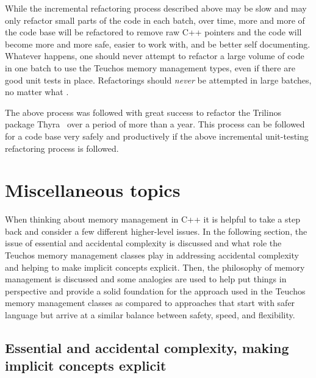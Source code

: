 \documentclass[pdf,ps2pdf,11pt]{SANDreport}
\begin{document}
While the incremental refactoring process described above may be slow
and may only refactor small parts of the code in each batch, over
time, more and more of the code base will be refactored to remove raw
C++ pointers and the code will become more and more safe, easier to
work with, and be better self documenting.  Whatever happens, one
should never attempt to refactor a large volume of code in one batch
to use the Teuchos memory management types, even if there are good
unit tests in place.  Refactorings should {}\textit{never} be
attempted in large batches, no matter what
{}\cite{WorkingEffectivelyWithLegacyCode05}.

The above process was followed with great success to refactor the
Trilinos package Thyra~\cite{ThyraOperatorVectorSAND} over a period of
more than a year.  This process can be followed for a code base very
safely and productively if the above incremental unit-testing
refactoring process is followed.


%
{}\section{Miscellaneous topics}
\label{sec:misc-topics}
%

When thinking about memory management in C++ it is helpful to take a
step back and consider a few different higher-level issues.  In the
following section, the issue of essential and accidental complexity is
discussed and what role the Teuchos memory management classes play in
addressing accidental complexity and helping to make implicit concepts
explicit.  Then, the philosophy of memory management is discussed and
some analogies are used to help put things in perspective and provide
a solid foundation for the approach used in the Teuchos memory
management classes as compared to approaches that start with safer
language but arrive at a similar balance between safety, speed, and
flexibility.


%
{}\subsection{Essential and accidental complexity, making implicit
concepts explicit}
\label{sec:essentail-accidental-complexity}
%
\end{document}
